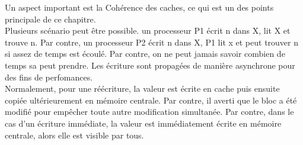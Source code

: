 \documentclass[oneside]{book}
\begin{document}
Un aspect important est la Cohérence des caches, ce qui est un des points principale de ce chapitre.\\

Plusieurs scénario peut être possible. un processeur P1 écrit n dans X, lit X et trouve n. Par contre, un processeur P2 écrit n dans X, P1 lit x et peut trouver n si assez de temps est écoulé. Par contre, on ne peut jamais savoir combien de temps sa peut prendre. Les écriture sont propagées de manière asynchrone pour des fins de perfomances.\\

Normalement, pour une réécriture, la valeur est écrite en cache puis ensuite copiée ultérieurement en mémoire centrale. Par contre, il averti que le bloc a été modifié pour empêcher toute autre modification simultanée. Par contre, dans le cas d'un écriture immédiate, la valeur est immédiatement écrite en mémoire centrale, alors elle est visible par tous.\\
\end{document}
